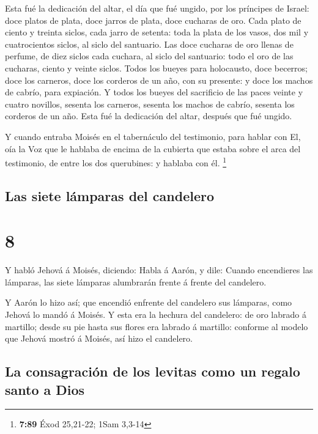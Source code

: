 Esta fué la dedicación del altar, el día que fué ungido,
por los príncipes de Israel: doce platos de plata, doce jarros de plata,
doce cucharas de oro.  Cada plato de ciento y treinta
siclos, cada jarro de setenta: toda la plata de los vasos, dos mil y
cuatrocientos siclos, al siclo del santuario.  Las doce
cucharas de oro llenas de perfume, de diez siclos cada cuchara, al siclo
del santuario: todo el oro de las cucharas, ciento y veinte siclos.
 Todos los bueyes para holocausto, doce becerros; doce
los carneros, doce los corderos de un año, con su presente: y doce los
machos de cabrío, para expiación.  Y todos los bueyes del
sacrificio de las paces veinte y cuatro novillos, sesenta los carneros,
sesenta los machos de cabrío, sesenta los corderos de un año. Esta fué
la dedicación del altar, después que fué ungido.

 Y cuando entraba Moisés en el tabernáculo del
testimonio, para hablar con El, oía la Voz que le hablaba de encima de
la cubierta que estaba sobre el arca del testimonio, de entre los dos
querubines: y hablaba con él. \footnote{\textbf{7:89} Éxod 25,21-22;
  1Sam 3,3-14}

\hypertarget{las-siete-luxe1mparas-del-candelero}{%
\subsection{Las siete lámparas del
candelero}\label{las-siete-luxe1mparas-del-candelero}}

\hypertarget{section-7}{%
\section{8}\label{section-7}}

 Y habló Jehová á Moisés, diciendo:  Habla á
Aarón, y dile: Cuando encendieres las lámparas, las siete lámparas
alumbrarán frente á frente del candelero.

 Y Aarón lo hizo así; que encendió enfrente del candelero
sus lámparas, como Jehová lo mandó á Moisés.  Y esta era
la hechura del candelero: de oro labrado á martillo; desde su pie hasta
sus flores era labrado á martillo: conforme al modelo que Jehová mostró
á Moisés, así hizo el candelero.

\hypertarget{la-consagraciuxf3n-de-los-levitas-como-un-regalo-santo-a-dios}{%
\subsection{La consagración de los levitas como un regalo santo a
Dios}\label{la-consagraciuxf3n-de-los-levitas-como-un-regalo-santo-a-dios}}

